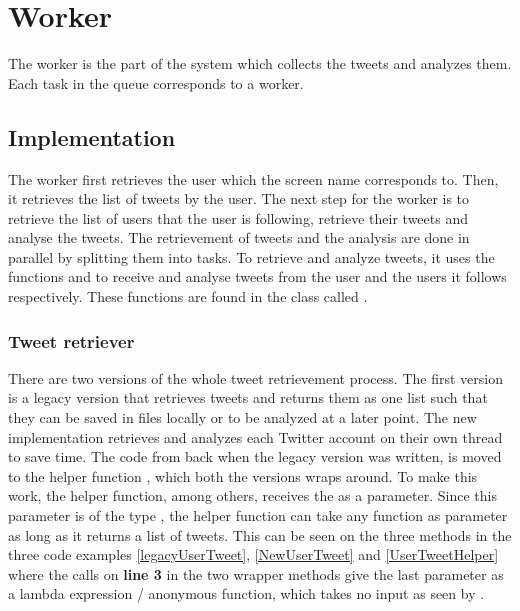 \chapter{Worker}\label{workerLabel}
The worker is the part of the system which collects the tweets and analyzes
them. Each task in the queue corresponds to a worker.

\section{Implementation}
The worker first retrieves the user which the screen name corresponds to. Then,
it retrieves the list of tweets by the user. The next step for the worker is to
retrieve the list of users that the user is following, retrieve their tweets and
analyse the tweets. The retrievement of tweets and the analysis are done in
parallel by splitting them into tasks. To retrieve and analyze tweets, it uses
the functions  and
 to receive and analyse tweets from the
user and the users it follows respectively. These functions are found in the
class called .

\subsection{Tweet retriever} \label{sub:tweetretriever}
There are two versions of the whole tweet retrievement process. The first
version is a legacy version that retrieves tweets and returns them as one list
such that they can be saved in files locally or to be analyzed at a later point.
The new implementation retrieves and analyzes each Twitter account on their own
thread to save time. The code from back when the legacy version was written, is
moved to the helper function , which both the
versions wraps around. To make this work, the helper function, among others,
receives the  as a parameter. Since this parameter is of
the type , the helper function can take any function as
parameter as long as it returns a list of tweets.
This can be seen on the three methods in the three code examples
\autoref{legacyUserTweet}, \autoref{NewUserTweet} and \autoref{UserTweetHelper}
where the calls on \textbf{line 3} in the two wrapper methods give the last
parameter as a lambda expression / anonymous function, which takes no input as
seen by \textc{() =>}.\\

